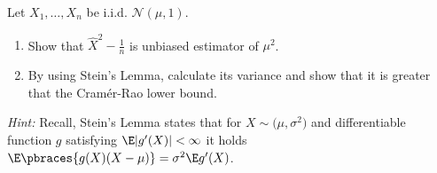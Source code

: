 
\begin{exercise}

Let $X_1, \dots, X_n$ be i.i.d. $\mathcal N(\mu, 1)$.

\begin{enumerate}[label = (\alph*)]
    \item Show that $\hat X^2 - \frac{1}{n}$ is unbiased estimator of $\mu^2$.
    \item By using Stein's Lemma, calculate its variance and show that it is greater that the Cramér-Rao lower bound.
\end{enumerate}

\textit{Hint:}
Recall, Stein's Lemma states that for $X \sim \mathcal(\mu, \sigma^2)$ and differentiable function $g$ satisfying $\E|g^\prime(X)| < \infty$ it holds $\E \pbraces{g(X) (X - \mu)} = \sigma^2 \E g^\prime(X)$.

\end{exercise}


